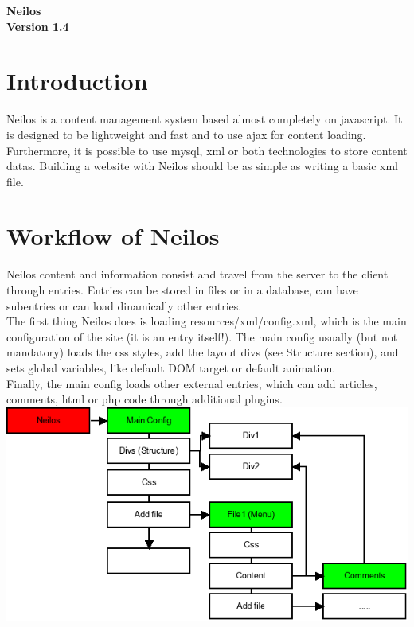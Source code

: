 \documentclass[a4paper,12pt]{article}
\begin{document}
\begin{center}
 \huge \bfseries {Neilos}\\
 \normalfont \normalsize Version 1.4
\\[0.5cm]
\end{center}
\tableofcontents
\newpage
\section{Introduction}
Neilos is a content management system based almost completely on javascript. It is designed to be lightweight and fast and to use ajax for content loading. Furthermore, it is possible to use mysql, xml or both technologies to store content datas. Building a website with Neilos should be as simple as writing a basic xml file.
\section{Workflow of Neilos}
Neilos content and information consist and travel from the server to the client through entries. Entries can be stored in files or in a database, can have subentries or can load dinamically other entries.\\
The first thing Neilos does is loading resources/xml/config.xml, which is the main configuration of the site (it is an entry itself!). The main config usually (but not mandatory) loads the css styles, add the layout divs (see Structure section), and sets global variables, like default DOM target or default animation. \\
Finally, the main config loads other external entries, which can add articles, comments, html or php code through additional plugins.\\
\includegraphics[scale=0.7]{Diagramma_neilos.png} \\
\end{document}
